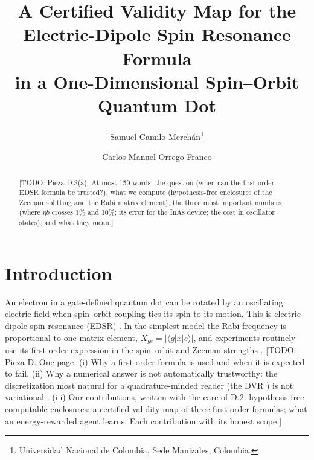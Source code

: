 \documentclass[11pt]{article}
\title{A Certified Validity Map for the Electric-Dipole Spin Resonance Formula\\
in a One-Dimensional Spin--Orbit Quantum Dot}
\author{Samuel Camilo Merch\'an\thanks{Universidad Nacional de Colombia, Sede Manizales, Colombia.}
\and Carlos Manuel Orrego Franco\footnotemark[1]}
\date{\todo{date}}
\theoremstyle{remark}
\newcommand{\todo}[1]{\textcolor{red!70!black}{[TODO: #1]}}
\newcommand{\bra}[1]{\langle #1|}
\newcommand{\ket}[1]{|#1\rangle}
\newcommand{\xge}{X_{ge}}
\begin{document}
\maketitle

\begin{abstract}
\todo{Pieza D.3(a). At most 150 words: the question (when can the first-order EDSR formula be trusted?), what we compute (hypothesis-free enclosures of the Zeeman splitting and the Rabi matrix element), the three most important numbers (where $\eta b$ crosses 1\% and 10\%; its error for the InAs device; the cost in oscillator states), and what they mean.}
\end{abstract}

\section{Introduction}\label{sec:intro}
An electron in a gate-defined quantum dot can be rotated by an oscillating electric field when spin--orbit coupling ties its spin to its motion. This is electric-dipole spin resonance (EDSR) \cite{rashbaefros2003,golovach2006,nowack2007,nadjperge2010}. In the simplest model the Rabi frequency is proportional to one matrix element, $\xge=|\bra{g}x\ket{e}|$, and experiments routinely use its first-order expression in the spin--orbit and Zeeman strengths \cite{golovach2006,nowack2007}.
\todo{Pieza D. One page. (i) Why a first-order formula is used and when it is expected to fail. (ii) Why a numerical answer is not automatically trustworthy: the discretization most natural for a quadrature-minded reader (the DVR \cite{light1985}) is not variational \cite{lombardi2004}. (iii) Our contributions, written with the care of D.2: hypothesis-free computable enclosures; a certified validity map of three first-order formulas; what an energy-rewarded agent learns. Each contribution with its honest scope.}
\end{document}
